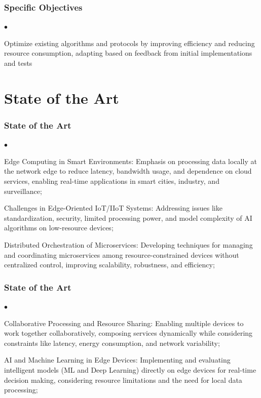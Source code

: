 \documentclass[tikz]{beamer}
\begin{document}
\begin{frame}
\frametitle{Specific Objectives}
\begin{list}{$\bullet$}{}
    \item Optimize existing algorithms and protocols by improving efficiency and reducing resource consumption, adapting based on feedback from initial implementations and tests 
\end{list}
\end{frame}
\section{State of the Art}
\begin{frame}
\frametitle{State of the Art}
\begin{list}{$\bullet$}{}
    \item Edge Computing in Smart Environments: Emphasis on processing data locally at the network edge to reduce latency, bandwidth usage, and dependence on cloud services, enabling real-time applications in smart cities, industry, and surveillance;
    \item Challenges in Edge-Oriented IoT/IIoT Systems: Addressing issues like standardization, security, limited processing power, and model complexity of AI algorithms on low-resource devices;
    \item Distributed Orchestration of Microservices: Developing techniques for managing and coordinating microservices among resource-constrained devices without centralized control, improving scalability, robustness, and efficiency;
    
\end{list}
\end{frame}

\begin{frame}
\frametitle{State of the Art}
\begin{list}{$\bullet$}{}
    \item Collaborative Processing and Resource Sharing: Enabling multiple devices to work together collaboratively, composing services dynamically while considering constraints like latency, energy consumption, and network variability;
    \item AI and Machine Learning in Edge Devices: Implementing and evaluating intelligent models (ML and Deep Learning) directly on edge devices for real-time decision making, considering resource limitations and the need for local data processing;
    
\end{list}
\end{frame}
\end{document}

